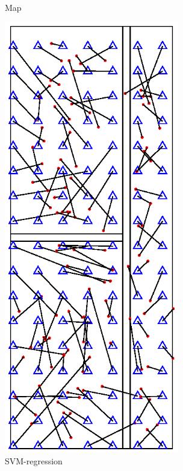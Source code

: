 \documentclass[a4paper,10pt]{article}
\begin{document}
\begin{CJK*}{UTF8}{gbsn}
\begin{figure}[h]
\begin{minipage}[t]{0.5\linewidth}
\caption{Map}
\label{map}
\end{minipage}
\begin{minipage}[t]{0.5\linewidth}
\centering
\includegraphics[width=3in]{SVR.eps}
\caption{SVM-regression}
\label{SVR}
\end{minipage}
\begin{minipage}[t]{0.5\linewidth}
\centering

\end{minipage}
\end{figure}
\end{CJK*}
\end{document}
